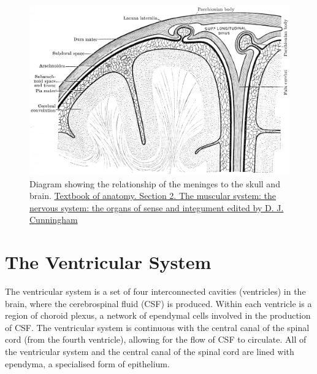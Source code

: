 \begin{figure}

{\centering \includegraphics[width=0.7\linewidth]{./figures/cns/meninges} 

}

\caption{Diagram showing the relationship of the meninges to the skull and brain. \href{https://wellcomelibrary.org/item/b21271070}{Textbook of anatomy. Section 2. The muscular system: the nervous system: the organs of sense and integument edited by D. J. Cunningham}}\label{fig:meninges}
\end{figure}

\hypertarget{the-ventricular-system}{%
\section{The Ventricular System}\label{the-ventricular-system}}

The ventricular system is a set of four interconnected cavities (ventricles) in the brain, where the cerebrospinal fluid (CSF) is produced. Within each ventricle is a region of choroid plexus, a network of ependymal cells involved in the production of CSF. The ventricular system is continuous with the central canal of the spinal cord (from the fourth ventricle), allowing for the flow of CSF to circulate. All of the ventricular system and the central canal of the spinal cord are lined with ependyma, a specialised form of epithelium.




